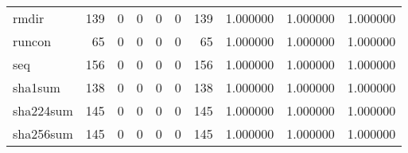 \begin{tabular}{lrrrrrrrrr}
rmdir     &                                   139 &                                                  0 &                                                  0 &                                                  0 &                                                  0 &                                                139 &                                           1.000000 &                               1.000000 &                             1.000000 \\
runcon    &                                    65 &                                                  0 &                                                  0 &                                                  0 &                                                  0 &                                                 65 &                                           1.000000 &                               1.000000 &                             1.000000 \\
seq       &                                   156 &                                                  0 &                                                  0 &                                                  0 &                                                  0 &                                                156 &                                           1.000000 &                               1.000000 &                             1.000000 \\
sha1sum   &                                   138 &                                                  0 &                                                  0 &                                                  0 &                                                  0 &                                                138 &                                           1.000000 &                               1.000000 &                             1.000000 \\
sha224sum &                                   145 &                                                  0 &                                                  0 &                                                  0 &                                                  0 &                                                145 &                                           1.000000 &                               1.000000 &                             1.000000 \\
sha256sum &                                   145 &                                                  0 &                                                  0 &                                                  0 &                                                  0 &                                                145 &                                           1.000000 &                               1.000000 &                             1.000000 \\

\end{tabular}
